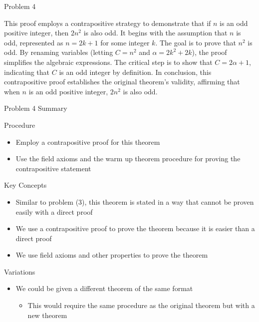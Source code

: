 \begin{problem}{Problem 4}
\begin{highlight}[Solution]
        \vspace*{1em}

        This proof employs a contrapositive strategy to demonstrate that if $n$ is an odd positive integer, then $2n^2$ is also odd. It begins with the assumption that $n$ is odd, represented as 
        $n = 2k + 1$ for some integer $k$. The goal is to prove that $n^2$ is odd. By renaming variables (letting $C = n^2$ and $\alpha = 2k^2 + 2k$), the proof simplifies the algebraic expressions. 
        The critical step is to show that $C = 2\alpha + 1$, indicating that $C$ is an odd integer by definition. In conclusion, this contrapositive proof establishes the original theorem's validity, 
        affirming that when $n$ is an odd positive integer, $2n^2$ is also odd.
    \end{highlight}
\end{problem}

\begin{summary}{Problem 4 Summary}
    \begin{statement}{Procedure}
        \begin{itemize}
            \item Employ a contrapositive proof for this theorem
            \item Use the field axioms and the warm up theorem procedure for proving the contrapositive statement
        \end{itemize}
    \end{statement}
    \begin{statement}{Key Concepts}
        \begin{itemize}
            \item Similar to problem (3), this theorem is stated in a way that cannot be proven easily with a direct proof
            \item We use a contrapositive proof to prove the theorem because it is easier than a direct proof
            \item We use field axioms and other properties to prove the theorem
        \end{itemize}
    \end{statement}
    \begin{statement}{Variations}
        \begin{itemize}
            \item We could be given a different theorem of the same format
            \begin{itemize}
                \item This would require the same procedure as the original theorem but with a new theorem
            \end{itemize}
        \end{itemize}
    \end{statement}
\end{summary}

